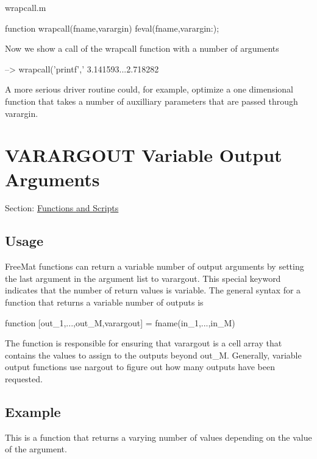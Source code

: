 \begin{DoxyVerb}     wrapcall.m
\end{DoxyVerb}



\begin{DoxyVerbInclude}
function wrapcall(fname,varargin)
  feval(fname,varargin{:});
\end{DoxyVerbInclude}


Now we show a call of the {\ttfamily wrapcall} function with a number of arguments


\begin{DoxyVerbInclude}
--> wrapcall('printf','%
3.141593...2.718282
\end{DoxyVerbInclude}


A more serious driver routine could, for example, optimize a one dimensional function that takes a number of auxilliary parameters that are passed through {\ttfamily varargin}. \hypertarget{functions_varargout}{}\section{V\-A\-R\-A\-R\-G\-O\-U\-T Variable Output Arguments}\label{functions_varargout}
Section\-: \hyperlink{sec_functions}{Functions and Scripts} \hypertarget{vtkwidgets_vtkxyplotwidget_Usage}{}\subsection{Usage}\label{vtkwidgets_vtkxyplotwidget_Usage}
Free\-Mat functions can return a variable number of output arguments by setting the last argument in the argument list to {\ttfamily varargout}. This special keyword indicates that the number of return values is variable. The general syntax for a function that returns a variable number of outputs is \begin{DoxyVerb}  function [out_1,...,out_M,varargout] = fname(in_1,...,in_M)
\end{DoxyVerb}
 The function is responsible for ensuring that {\ttfamily varargout} is a cell array that contains the values to assign to the outputs beyond {\ttfamily out\-\_\-\-M}. Generally, variable output functions use {\ttfamily nargout} to figure out how many outputs have been requested. \hypertarget{variables_struct_Example}{}\subsection{Example}\label{variables_struct_Example}
This is a function that returns a varying number of values depending on the value of the argument.

